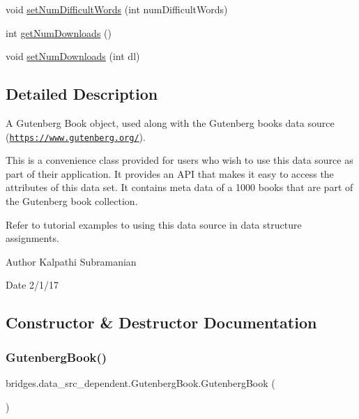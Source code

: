 \begin{DoxyCompactItemize}
\item 
void \mbox{\hyperlink{classbridges_1_1data__src__dependent_1_1_gutenberg_book_a3b817aed71eab713aad3afe6f02ef3ed}{set\+Num\+Difficult\+Words}} (int num\+Difficult\+Words)
\item 
int \mbox{\hyperlink{classbridges_1_1data__src__dependent_1_1_gutenberg_book_ab15136957384a78824d9a1bccdc41fd5}{get\+Num\+Downloads}} ()
\item 
void \mbox{\hyperlink{classbridges_1_1data__src__dependent_1_1_gutenberg_book_aa871c9aa9a34d7de8409c1c0f24c3dbe}{set\+Num\+Downloads}} (int dl)
\end{DoxyCompactItemize}


\subsection{Detailed Description}
A Gutenberg Book object, used along with the Gutenberg books data source (\href{https://www.gutenberg.org/}{\tt https\+://www.\+gutenberg.\+org/}). 

This is a convenience class provided for users who wish to use this data source as part of their application. It provides an A\+PI that makes it easy to access the attributes of this data set. It contains meta data of a 1000 books that are part of the Gutenberg book collection.

Refer to tutorial examples to using this data source in data structure assignments.

\begin{DoxyAuthor}{Author}
Kalpathi Subramanian 
\end{DoxyAuthor}
\begin{DoxyDate}{Date}
2/1/17 
\end{DoxyDate}


\subsection{Constructor \& Destructor Documentation}
\mbox{\label{classbridges_1_1data__src__dependent_1_1_gutenberg_book_a34e237fe23613dad17e4b5e005077927}} 
\subsubsection{\texorpdfstring{Gutenberg\+Book()}{GutenbergBook()}\hspace{0.1cm}{\footnotesize\ttfamily [1/2]}}
{\footnotesize\ttfamily bridges.\+data\+\_\+src\+\_\+dependent.\+Gutenberg\+Book.\+Gutenberg\+Book (\begin{DoxyParamCaption}{ }\end{DoxyParamCaption})}

